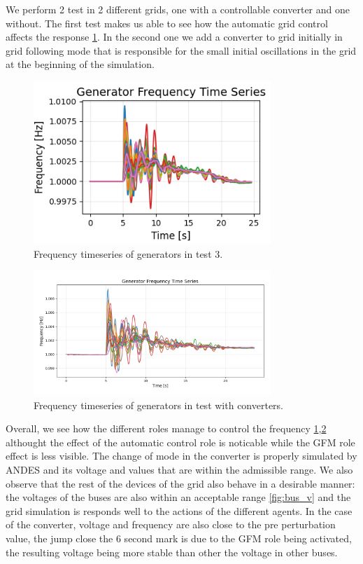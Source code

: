 \documentclass{article}
\begin{document}
We perform 2 test in 2 different grids, one with a controllable converter and one without. The first test makes us able to see how the automatic grid control affects the response \ref{fig:test_pid}. In the second one we add a converter to grid initially in grid following mode that is responsible for the small initial oscillations in the grid at the beginning of the simulation.

\begin{figure}[ht]
\centering
\includegraphics[width=0.8\textwidth]{figures/npcc_pid.png} %
\caption{Frequency timeseries of generators in test 3.}
\label{fig:test_pid}
\end{figure}


\begin{figure}[ht]
\centering
\includegraphics[width=0.8\textwidth]{figures/npcc_gfm.png} %
\caption{Frequency timeseries of generators in test with converters.}
\label{fig:test_gfm}
\end{figure}

 Overall, we see how the different roles manage to control the frequency \ref{fig:test_pid},\ref{fig:test_gfm} althought the effect of the automatic control role is noticable while the GFM role effect is less visible. The change of mode in the converter is properly simulated by ANDES and its voltage and  values that are within the admissible range. We also observe that the rest of the devices of the grid also behave in a desirable manner: the voltages of the buses are also within an acceptable range \ref{fig:bus_v} and the grid simulation is responds well to the actions of the different agents. In the case of the converter, voltage and frequency are also close to the pre perturbation value, the jump close the 6 second mark is due to the GFM role being activated, the resulting voltage being more stable than other the voltage in other buses. 
\end{document}
